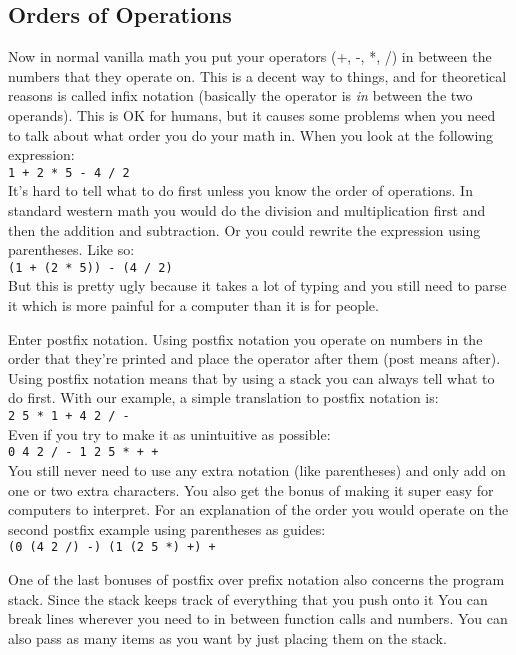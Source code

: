 \subsection*{Orders of Operations}
Now in normal vanilla math you put your operators (+, -, *, /) in between the
numbers that they operate on. This is a decent way to things, and for
theoretical reasons is called infix notation (basically the operator is
\emph{in} between the two operands). This is OK for humans, but it causes some
problems when you need to talk about what order you do your math in. When
you look at the following expression:\\
\indent\texttt{1 + 2 * 5 - 4 / 2}\\
It's hard to tell what to do first unless you know the order of operations.
In standard western math you would do the division and multiplication first
and then the addition and subtraction. Or you could rewrite the expression
using parentheses. Like so:\\
\indent\texttt{(1 + (2 * 5)) - (4 / 2)}\\
But this is pretty ugly because it takes a lot of typing and you still
need to parse it which is more painful for a computer than it is for people.

Enter postfix notation. Using postfix notation you operate on numbers in the
order that they're printed and place the operator after them (post means after).
Using postfix notation means that by using a stack you can always tell what to
do first. With our example, a simple translation to postfix notation is:\\
\indent\texttt{2 5 * 1 + 4 2 / -}\\
Even if you try to make it as unintuitive as possible:\\
\indent\texttt{0 4 2 / - 1 2 5 * + +}\\
You still never need to use any extra notation (like parentheses) and only add
on one or two extra characters. You also get the bonus of making it
super easy for computers to interpret. For an explanation of the order you
would operate on the second postfix example using parentheses as guides:\\
\indent\texttt{(0 (4 2 /) -) (1 (2 5 *) +) +}

One of the last bonuses of postfix over prefix notation also concerns the
program stack. Since the stack keeps track of everything that you push onto it
You can break lines wherever you need to in between function calls and numbers.
You can also pass as many items as you want by just placing them on the stack.

